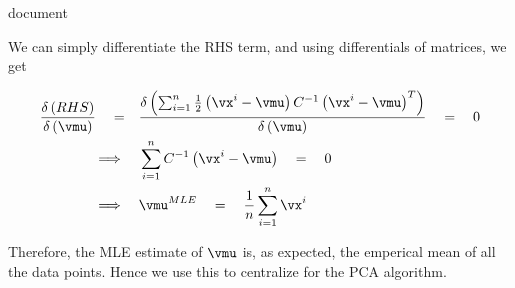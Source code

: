 document\documentclass{article}
\begin{document}
\begin{mlsolution}
\begin{addmargin}{1.5em}
		We can simply differentiate the RHS term, and using differentials of matrices, we get

		\begin{align*}
			\derp{RHS}{\vmu}	\eq&	\derp{\sum_{i = 1}^{n} \frac{1}{2} \para{\vx^i - \vmu} C^{-1} \para{\vx^i - \vmu}^T}{\vmu}	\eq	0 \\
								\qimpl&	\sum_{i = 1}^{n} C^{-1} \para{\vx^i - \vmu}	\eq	0 \\
								\qimpl&	\vmu^{MLE}	\eq	\frac{1}{n} \sum_{i = 1}^{n} \vx^i
		\end{align*}

		Therefore, the MLE estimate of $\vmu$ is, as expected, the emperical mean of all the data points. Hence we use this to centralize for the PCA algorithm.

	\end{addmargin}

\end{mlsolution}
\end{document}
